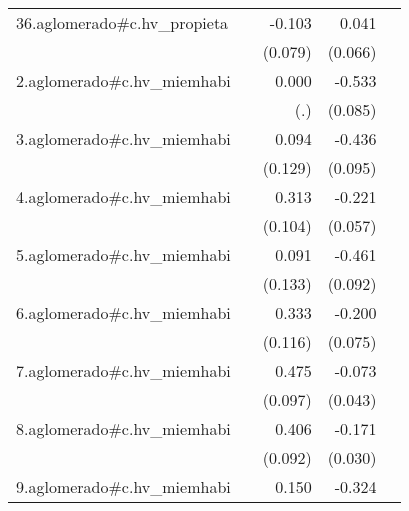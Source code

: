 {\begin{longtable}{l*{4}{D{.}{.}{-1}}}
\addlinespace
36.aglomerado#c.hv\_propieta&                     &      -0.103         &       0.041         &                     \\
            &                     &     (0.079)         &     (0.066)         &                     \\
\addlinespace
2.aglomerado#c.hv\_miemhabi&                     &       0.000         &      -0.533\sym{***}&                     \\
            &                     &         (.)         &     (0.085)         &                     \\
\addlinespace
3.aglomerado#c.hv\_miemhabi&                     &       0.094         &      -0.436\sym{***}&                     \\
            &                     &     (0.129)         &     (0.095)         &                     \\
\addlinespace
4.aglomerado#c.hv\_miemhabi&                     &       0.313\sym{**} &      -0.221\sym{***}&                     \\
            &                     &     (0.104)         &     (0.057)         &                     \\
\addlinespace
5.aglomerado#c.hv\_miemhabi&                     &       0.091         &      -0.461\sym{***}&                     \\
            &                     &     (0.133)         &     (0.092)         &                     \\
\addlinespace
6.aglomerado#c.hv\_miemhabi&                     &       0.333\sym{**} &      -0.200\sym{**} &                     \\
            &                     &     (0.116)         &     (0.075)         &                     \\
\addlinespace
7.aglomerado#c.hv\_miemhabi&                     &       0.475\sym{***}&      -0.073         &                     \\
            &                     &     (0.097)         &     (0.043)         &                     \\
\addlinespace
8.aglomerado#c.hv\_miemhabi&                     &       0.406\sym{***}&      -0.171\sym{***}&                     \\
            &                     &     (0.092)         &     (0.030)         &                     \\
\addlinespace
9.aglomerado#c.hv\_miemhabi&                     &       0.150         &      -0.324\sym{***}&                     \\

\end{longtable}}

